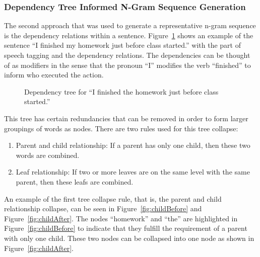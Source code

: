 \documentclass{article}[10]
\begin{document}
\subsubsection{Dependency Tree Informed N-Gram Sequence Generation\label{sec:dependency}}

The second approach that was used to generate a representative n-gram sequence is the dependency relations within a sentence. Figure~\ref{fig:dep} shows an example of the sentence ``I finished my homework just before class started.'' with the part of speech tagging and the dependency relations. The dependencies can be thought of as modifiers in the sense that the pronoun ``I'' modifies the verb ``finished'' to inform who executed the action.

\begin{figure}[H]
  \begin{center}
    \caption{Dependency tree for ``I finished the homework just before class
      started.''\label{fig:dep}}
  \end{center}
\end{figure}

This tree has certain redundancies that can be removed in order to form larger groupings of words as nodes. There are two rules used for this tree collapse:

\begin{enumerate}[label=(\arabic*)]
    \item{Parent and child relationship: If a parent has only one child, then these two words are combined.}
    \item{Leaf relationship: If two or more leaves are on the same level with
    the same parent, then these leafs are combined.}
\end{enumerate}

An example of the first tree collapse rule, that is, the parent and child relationship collapse, can be seen in Figure~\ref{fig:childBefore} and Figure~\ref{fig:childAfter}. The nodes ``homework'' and ``the'' are highlighted in Figure~\ref{fig:childBefore} to indicate that they fulfill the requirement of a parent with only one child. These two nodes can be collapsed into one node as shown in Figure~\ref{fig:childAfter}.
\end{document}
